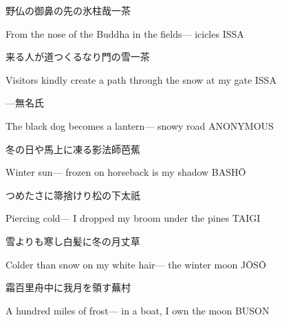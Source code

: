 \begin{haiku}
    {\FH 野仏の御鼻の先の氷柱哉}\hfill{\FH 一茶}

    \vin{} From the nose
    \vin{} \vin{} of the Buddha in the fields---
    \vin{} \vin{} \vin{} icicles \hspace{\fill} ISSA
\end{haiku}

\begin{haiku}
    {\FH 来る人が道つくるなり門の雪}\hfill{\FH 一茶}

    \vin{} Visitors
    \vin{} \vin{} kindly create a path
    \vin{} \vin{} \vin{} through the snow at my gate \hspace{\fill} ISSA
\end{haiku}

\begin{haiku}
    {---}\hfill{\FH 無名氏}

    \vin{} The black dog
    \vin{} \vin{} becomes a lantern---
    \vin{} \vin{} \vin{} snowy road \hspace{\fill} ANONYMOUS
\end{haiku}

\begin{haiku}
    {\FH 冬の日や馬上に凍る影法師}\hfill{\FH 芭蕉}

    \vin{} Winter sun---
    \vin{} \vin{} frozen on horseback
    \vin{} \vin{} \vin{} is my shadow \hspace{\fill} BASH\={O}
\end{haiku}

\begin{haiku}
    {\FH つめたさに箒捨けり松の下}\hfill{\FH 太祇}

    \vin{} Piercing cold---
    \vin{} \vin{} I dropped my broom
    \vin{} \vin{} \vin{} under the pines \hspace{\fill} TAIGI
\end{haiku}

\begin{haiku}
    {\FH 雪よりも寒し白髪に冬の月}\hfill{\FH 丈草}

    \vin{} Colder than snow
    \vin{} \vin{} on my white hair---
    \vin{} \vin{} \vin{} the winter moon \hspace{\fill} J\={O}S\={O}
\end{haiku}

\begin{haiku}
    {\FH 霜百里舟中に我月を領す}\hfill{\FH 蕪村}

    \vin{} A hundred miles of frost---
    \vin{} \vin{} in a boat, I own
    \vin{} \vin{} \vin{} the moon \hspace{\fill} BUSON
\end{haiku}

